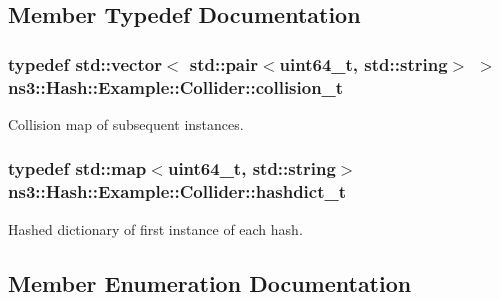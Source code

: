 \subsection{Member Typedef Documentation}
\subsubsection[{\texorpdfstring{collision\+\_\+t}{collision_t}}]{\setlength{\rightskip}{0pt plus 5cm}typedef std\+::vector$<$ std\+::pair$<$uint64\+\_\+t, std\+::string$>$ $>$ {\bf ns3\+::\+Hash\+::\+Example\+::\+Collider\+::collision\+\_\+t}\hspace{0.3cm}{\ttfamily [private]}}\hypertarget{classns3_1_1Hash_1_1Example_1_1Collider_ab509aacc15884475579257b59acefdea}{}\label{classns3_1_1Hash_1_1Example_1_1Collider_ab509aacc15884475579257b59acefdea}
Collision map of subsequent instances. 
\subsubsection[{\texorpdfstring{hashdict\+\_\+t}{hashdict_t}}]{\setlength{\rightskip}{0pt plus 5cm}typedef std\+::map$<$uint64\+\_\+t, std\+::string$>$ {\bf ns3\+::\+Hash\+::\+Example\+::\+Collider\+::hashdict\+\_\+t}\hspace{0.3cm}{\ttfamily [private]}}\hypertarget{classns3_1_1Hash_1_1Example_1_1Collider_a7851d0a567a058cd09a4d51937234eaa}{}\label{classns3_1_1Hash_1_1Example_1_1Collider_a7851d0a567a058cd09a4d51937234eaa}
Hashed dictionary of first instance of each hash. 

\subsection{Member Enumeration Documentation}

